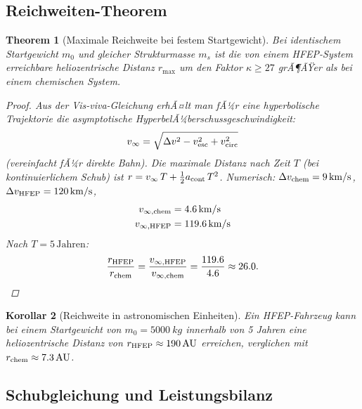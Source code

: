 ﻿\documentclass[a4paper,12pt,twoside]{article}
\theoremstyle{plain}
\newtheorem{theorem}{Theorem}[section]
\newtheorem{corollary}[theorem]{Korollar}
\theoremstyle{definition}
\theoremstyle{remark}
\newcommand{\Dv}{\Delta v}
\newcommand{\mzero}{m_0}
\begin{document}
	\subsection{Reichweiten-Theorem}
	
	\begin{theorem}[Maximale Reichweite bei festem Startgewicht]
		\label{thm:range}
		Bei identischem Startgewicht $\mzero$ und gleicher Strukturmasse $m_s$
		ist die von einem HFEP-System erreichbare heliozentrische Distanz $r_{\max}$ um den
		Faktor $\kappa \geq 27$ grÃ¶ÃŸer als bei einem chemischen System.
		\begin{proof}
			Aus der Vis-viva-Gleichung erhÃ¤lt man fÃ¼r eine hyperbolische Trajektorie die
			asymptotische Hyperbel\-Ã¼berschuss\-geschwindigkeit:
			\begin{equation}
				v_\infty = \sqrt{\Dv^2 - v_{\rm esc}^2 + v_{\rm circ}^2}
			\end{equation}
			(vereinfacht fÃ¼r direkte Bahn). Die maximale Distanz nach Zeit $T$ (bei kontinuierlichem
			Schub) ist $r = v_\infty\,T + \frac{1}{2}a_{\rm cont}\,T^2$.
			Numerisch: $\Dv_{\rm chem} = \SI{9}{km/s}$, $\Dv_{\rm HFEP} = \SI{120}{km/s}$,
			\begin{align}
				v_{\infty,\rm chem} &= \SI{4.6}{km/s} \\
				v_{\infty,\rm HFEP} &= \SI{119.6}{km/s}
			\end{align}
			Nach $T = 5\,\text{Jahren}$:
			\[
			\frac{r_{\rm HFEP}}{r_{\rm chem}}
			= \frac{v_{\infty,\rm HFEP}}{v_{\infty,\rm chem}}
			= \frac{119.6}{4.6} \approx 26.0.
			\qedhere
			\]
		\end{proof}
	\end{theorem}
	
	\begin{corollary}[Reichweite in astronomischen Einheiten]
		Ein HFEP-Fahrzeug kann bei einem Startgewicht von $m_0 = \SI{5000}{kg}$ innerhalb
		von 5 Jahren eine heliozentrische Distanz von $r_{\rm HFEP} \approx \SI{190}{AU}$
		erreichen, verglichen mit $r_{\rm chem} \approx \SI{7.3}{AU}$.
	\end{corollary}
	
	\subsection{Schubgleichung und Leistungsbilanz}
	
\end{document}

